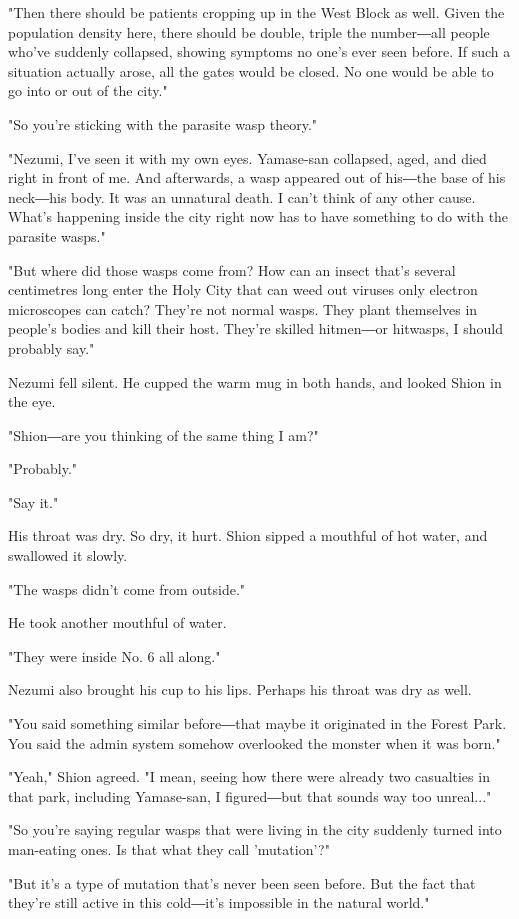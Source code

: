 "Then there should be patients cropping up in the West Block as well.
Given the population density here, there should be double, triple the
number―all people who've suddenly collapsed, showing symptoms no one's
ever seen before. If such a situation actually arose, all the gates
would be closed. No one would be able to go into or out of the city."

"So you're sticking with the parasite wasp theory."

"Nezumi, I've seen it with my own eyes. Yamase-san collapsed, aged, and
died right in front of me. And afterwards, a wasp appeared out of
his―the base of his neck―his body. It was an unnatural death. I can't
think of any other cause. What's happening inside the city right now has
to have something to do with the parasite wasps."

"But where did those wasps come from? How can an insect that's several
centimetres long enter the Holy City that can weed out viruses only
electron microscopes can catch? They're not normal wasps. They plant
themselves in people's bodies and kill their host. They're skilled
hitmen―or hitwasps, I should probably say."

Nezumi fell silent. He cupped the warm mug in both hands, and looked
Shion in the eye.

"Shion―are you thinking of the same thing I am?"

"Probably."

"Say it."

His throat was dry. So dry, it hurt. Shion sipped a mouthful of hot
water, and swallowed it slowly.

"The wasps didn't come from outside."

He took another mouthful of water.

"They were inside No. 6 all along."

Nezumi also brought his cup to his lips. Perhaps his throat was dry as
well.

"You said something similar before―that maybe it originated in the
Forest Park. You said the admin system somehow overlooked the monster
when it was born."

"Yeah," Shion agreed. "I mean, seeing how there were already two
casualties in that park, including Yamase-san, I figured―but that sounds
way too unreal..."

"So you're saying regular wasps that were living in the city suddenly
turned into man-eating ones. Is that what they call 'mutation'?"

"But it's a type of mutation that's never been seen before. But the fact
that they're still active in this cold―it's impossible in the natural
world."

